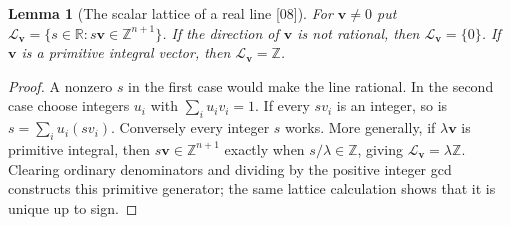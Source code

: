 \documentclass[11pt,oneside]{article}
\numberwithin{equation}{section}
\newtheorem{lemma}[lemma]{Lemma}
\theoremstyle{definition}
\theoremstyle{remark}
\newcommand{\Z}{\mathbb Z}
\newcommand{\R}{\mathbb R}
\newcommand{\src}[1]{\textup{\textsf{\small[#1]}}}
\begin{document}
\begin{lemma}[The scalar lattice of a real line \src{08}]\label{odg:frac:lem:lattice}
For $\mathbf v\ne0$ put
$\mathcal L_{\mathbf v}=\{s\in\R:s\mathbf v\in\Z^{n+1}\}$. If the direction of
$\mathbf v$ is not rational, then $\mathcal L_{\mathbf v}=\{0\}$. If $\mathbf v$
is a primitive integral vector, then $\mathcal L_{\mathbf v}=\Z$.
\end{lemma}
\begin{proof}
A nonzero $s$ in the first case would make the line rational. In the second
case choose integers $u_i$ with $\sum_iu_iv_i=1$. If every $sv_i$ is an
integer, so is $s=\sum_iu_i(sv_i)$. Conversely every integer $s$ works.
More generally, if $\lambda\mathbf v$ is primitive integral, then
$s\mathbf v\in\Z^{n+1}$ exactly when $s/\lambda\in\Z$, giving
$\mathcal L_{\mathbf v}=\lambda\Z$. Clearing ordinary denominators and
dividing by the positive integer gcd constructs this primitive generator;
the same lattice calculation shows that it is unique up to sign.
\end{proof}
\end{document}
